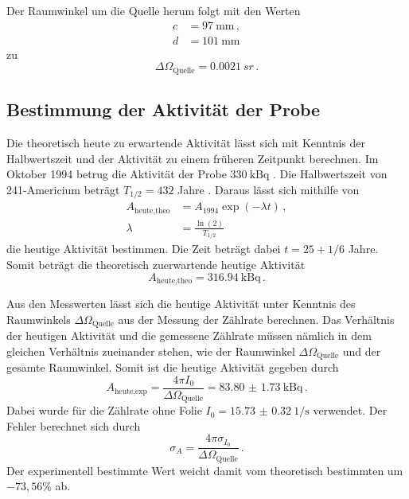Der Raumwinkel um die Quelle herum folgt mit den Werten \cite{Versuchsanleitung}
\begin{align*}
  c &= \SI{97}{\milli\meter} \,, \\
  d &= \SI{101}{\milli\meter}
\end{align*}
zu
\begin{equation*}
  \Delta \Omega_\text{Quelle} = \SI{0.0021}{sr} \,.
\end{equation*}

\newpage
\subsection{Bestimmung der Aktivität der Probe}
\label{subsec:aktivitaet}

Die theoretisch heute zu erwartende Aktivität lässt sich mit Kenntnis der Halbwertszeit
und der Aktivität zu einem früheren Zeitpunkt berechnen. Im Oktober 1994 betrug die
Aktivität der Probe $\SI{330}{\kilo\becquerel}$ \cite{Versuchsanleitung}. Die Halbwertszeit
von 241-Americium beträgt $T_{1/2}=432$ Jahre \cite{t12}. Daraus lässt sich mithilfe von
\begin{align*}
  A_{\text{heute,theo}}&= A_{1994}\exp(-\lambda t) \,, \\
  \lambda&= \frac{\ln(2)}{T_{1/2}}
\end{align*}
die heutige Aktivität bestimmen. Die Zeit beträgt dabei $t=25+1/6$ Jahre. Somit beträgt die
theoretisch zuerwartende heutige Aktivität
\begin{equation*}
  A_{\text{heute,theo}}= \SI{316.94}{\kilo\becquerel} \,.
\end{equation*}

Aus den Messwerten lässt sich die heutige Aktivität unter
Kenntnis des Raumwinkels $\Delta \Omega_{\text{Quelle}}$ aus der Messung der Zählrate berechnen.
Das Verhältnis der heutigen Aktivität und die gemessene Zählrate müssen nämlich in
dem gleichen Verhältnis zueinander stehen, wie der Raumwinkel $\Delta \Omega_{\text{Quelle}}$ und
der gesamte Raumwinkel. Somit ist die heutige Aktivität gegeben durch
\begin{equation*}
  A_{\text{heute,exp}}=\frac{4 \pi  I_0}{\Delta \Omega_{\text{Quelle}}}=\SI{83.80(173)}{\kilo\becquerel} \,.
\end{equation*}
Dabei wurde für die Zählrate ohne Folie $I_0=\SI{15.73(032)}{1 \per\second}$ verwendet.
Der Fehler berechnet sich durch
\begin{equation*}
  \sigma_A=\frac{4 \pi  \sigma_{I_0}}{\Delta \Omega_{\text{Quelle}}} \,.
\end{equation*}
Der experimentell bestimmte Wert weicht damit vom theoretisch bestimmten um
$-73{,}56\%$ ab.

